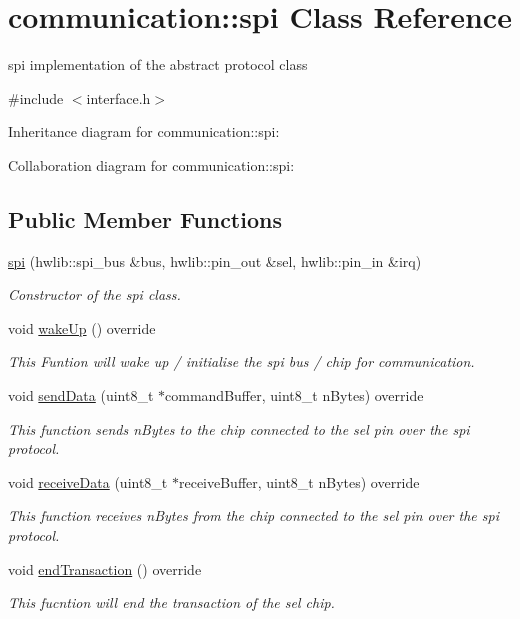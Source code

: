 \hypertarget{classcommunication_1_1spi}{}\section{communication\+:\+:spi Class Reference}
\label{classcommunication_1_1spi}


spi implementation of the abstract protocol class  




{\ttfamily \#include $<$interface.\+h$>$}



Inheritance diagram for communication\+:\+:spi\+:


Collaboration diagram for communication\+:\+:spi\+:
\subsection*{Public Member Functions}
\begin{DoxyCompactItemize}
\item 
\hyperlink{classcommunication_1_1spi_a60e6796f1d142783105b9016e782fbc2}{spi} (hwlib\+::spi\+\_\+bus \&bus, hwlib\+::pin\+\_\+out \&sel, hwlib\+::pin\+\_\+in \&irq)
\begin{DoxyCompactList}\small\item\em Constructor of the spi class. \end{DoxyCompactList}\item 
void \hyperlink{classcommunication_1_1spi_a7bc104e72a3f9efc946ef5ffdebfcc2a}{wake\+Up} () override
\begin{DoxyCompactList}\small\item\em This Funtion will wake up / initialise the spi bus / chip for communication. \end{DoxyCompactList}\item 
void \hyperlink{classcommunication_1_1spi_a4b0a72ad237253179cff221d92711596}{send\+Data} (uint8\+\_\+t $\ast$command\+Buffer, uint8\+\_\+t n\+Bytes) override
\begin{DoxyCompactList}\small\item\em This function sends n\+Bytes to the chip connected to the sel pin over the spi protocol. \end{DoxyCompactList}\item 
void \hyperlink{classcommunication_1_1spi_a42344d234d3f53829a3edac3949934de}{receive\+Data} (uint8\+\_\+t $\ast$receive\+Buffer, uint8\+\_\+t n\+Bytes) override
\begin{DoxyCompactList}\small\item\em This function receives n\+Bytes from the chip connected to the sel pin over the spi protocol. \end{DoxyCompactList}\item 
void \hyperlink{classcommunication_1_1spi_a9d10ed759010fef5c687b4f8e63a14f6}{end\+Transaction} () override
\begin{DoxyCompactList}\small\item\em This fucntion will end the transaction of the sel chip. \end{DoxyCompactList}\end{DoxyCompactItemize}
